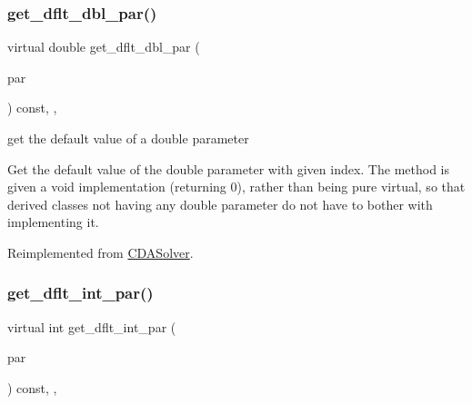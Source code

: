 \subsubsection{\texorpdfstring{get\+\_\+dflt\+\_\+dbl\+\_\+par()}{get\_dflt\_dbl\_par()}}
{\footnotesize\ttfamily virtual double get\+\_\+dflt\+\_\+dbl\+\_\+par (\begin{DoxyParamCaption}\item[{const \mbox{\hyperlink{class_s_m_spp__di__unipi__it_1_1_thin_compute_interface_aa3d710629ad8c434286726ad810c3b47}{idx\+\_\+type}}}]{par }\end{DoxyParamCaption}) const\hspace{0.3cm}{\ttfamily [inline]}, {\ttfamily [override]}, {\ttfamily [virtual]}}



get the default value of a double parameter 

Get the default value of the double parameter with given index. The method is given a void implementation (returning 0), rather than being pure virtual, so that derived classes not having any double parameter do not have to bother with implementing it. 

Reimplemented from \mbox{\hyperlink{class_s_m_spp__di__unipi__it_1_1_c_d_a_solver_a465a771c115acf8d5f4e32e22f003014}{C\+D\+A\+Solver}}.

\mbox{\label{class_s_m_spp__di__unipi__it_1_1_m_c_f_solver_a75dd1491b74c4b9476755e061dce3e04}} 
\subsubsection{\texorpdfstring{get\+\_\+dflt\+\_\+int\+\_\+par()}{get\_dflt\_int\_par()}}
{\footnotesize\ttfamily virtual int get\+\_\+dflt\+\_\+int\+\_\+par (\begin{DoxyParamCaption}\item[{const \mbox{\hyperlink{class_s_m_spp__di__unipi__it_1_1_thin_compute_interface_aa3d710629ad8c434286726ad810c3b47}{idx\+\_\+type}}}]{par }\end{DoxyParamCaption}) const\hspace{0.3cm}{\ttfamily [inline]}, {\ttfamily [override]}, {\ttfamily [virtual]}}



